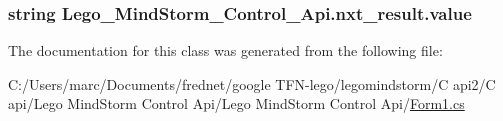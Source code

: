 \hypertarget{class_lego___mind_storm___control___api_1_1nxt__result_f7cd3aff794205cebd730ef8fa9beb8e}{
\subsubsection[{value}]{\setlength{\rightskip}{0pt plus 5cm}string {\bf Lego\_\-MindStorm\_\-Control\_\-Api.nxt\_\-result.value}}}
\label{class_lego___mind_storm___control___api_1_1nxt__result_f7cd3aff794205cebd730ef8fa9beb8e}




The documentation for this class was generated from the following file:\begin{CompactItemize}
\item 
C:/Users/marc/Documents/frednet/google TFN-lego/legomindstorm/C api2/C api/Lego MindStorm Control Api/Lego MindStorm Control Api/\hyperlink{_form1_8cs}{Form1.cs}\end{CompactItemize}
